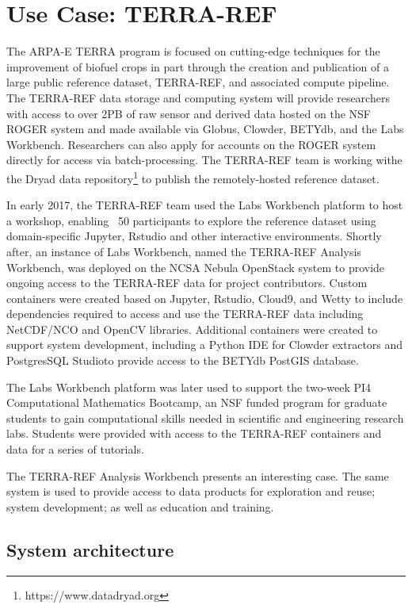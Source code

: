 \documentclass{sig-alternate}
\begin{document}
\section{Use Case: TERRA-REF}

The ARPA-E TERRA program is focused on cutting-edge techniques for the improvement of biofuel crops in part through the creation and publication of a large public reference dataset, TERRA-REF, and associated compute pipeline\cite{arpae2015}. The TERRA-REF data storage and computing system will provide researchers with access to over 2PB of raw sensor and derived data hosted on the NSF ROGER system and made available via Globus, Clowder, BETYdb, and the Labs Workbench. Researchers can also apply for accounts on the ROGER system directly for access via batch-processing. The TERRA-REF team is working withe the Dryad data repository\footnote{https://www.datadryad.org} to publish the remotely-hosted reference dataset.

In early 2017, the TERRA-REF team used the Labs Workbench platform to host a workshop, enabling ~50 participants to explore the reference dataset using domain-specific Jupyter, Rstudio and other interactive environments. Shortly after, an instance of Labs Workbench, named the TERRA-REF Analysis Workbench, was deployed on the NCSA Nebula OpenStack system to provide ongoing access to the TERRA-REF data for project contributors. Custom containers were created based on Jupyter, Rstudio, Cloud9, and Wetty to include dependencies required to access and use the TERRA-REF data including NetCDF/NCO and OpenCV libraries.  Additional containers were created to support system development, including a Python IDE for Clowder extractors and PostgresSQL Studioto provide access to the BETYdb PostGIS database.

The Labs Workbench platform was later used to support the two-week PI4 Computational Mathematics Bootcamp, an NSF funded program for graduate students to gain computational skills needed in scientific and engineering research labs. Students were provided with access to the TERRA-REF containers and data for a series of tutorials. 


The TERRA-REF Analysis Workbench presents an interesting case. The same system is used to provide access to data products for exploration and reuse; system development; as well as education and training.

\subsection{System architecture}
\end{document}
